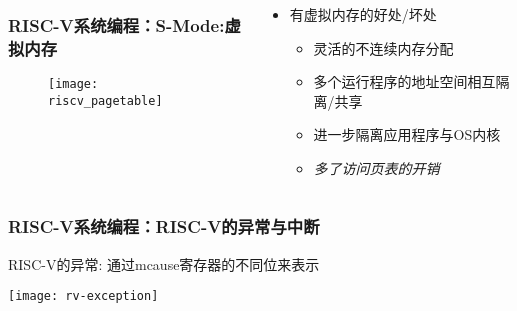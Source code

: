 \begin{frame}[plain]
    
    \begin{columns}
        \begin{column}{0.6\textwidth}
            
            \frametitle{RISC-V系统编程：S-Mode:虚拟内存}
            
            \begin{figure}
                \centering
                \texttt{[image: riscv\_pagetable]}
            \end{figure}
            
        \end{column}
        
        \begin{column}{0.4\textwidth}
            
            \begin{itemize}
                \item 有虚拟内存的好处/坏处
                \begin{itemize}
                    \item 灵活的不连续内存分配
                    \item 多个运行程序的地址空间相互隔离/共享
                    \item 进一步隔离应用程序与OS内核
                    \item \textit{多了访问页表的开销} 
                \end{itemize} 
            \end{itemize}
            
        \end{column}
        
    \end{columns}
    
    
\end{frame}



\begin{frame}
    \frametitle{RISC-V系统编程：RISC-V的异常与中断}
    RISC-V的异常: 通过mcause寄存器的不同位来表示
    
    \centering
    \texttt{[image: rv-exception]}
    
\end{frame}

